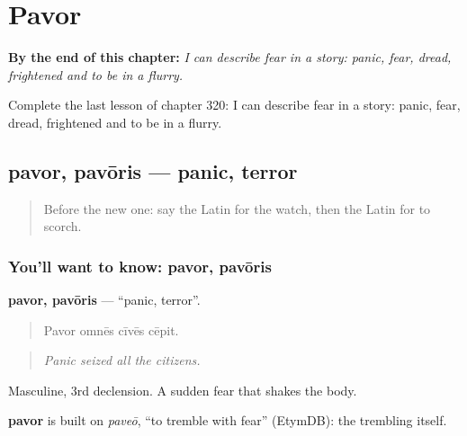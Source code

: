 
\chapter{Pavor}
\label{ch:la-pavor}

\begin{chapteropening}
\textbf{By the end of this chapter:} \emph{I can describe fear in a story: panic, fear, dread, frightened and to be in a flurry.}

Complete the last lesson of chapter 320: I can describe fear in a story: panic, fear, dread, frightened and to be in a flurry.
\end{chapteropening}

\section[pavor, pavōris]{pavor, pavōris — panic, terror}

\label{lesson:LA-C320-pavor}



\begin{quote}
Before the new one: say the Latin for the watch, then the Latin for to scorch.
\end{quote}

\subsection*{You'll want to know: pavor, pavōris}
\textbf{pavor, pavōris} — \textquotedblleft{}panic, terror\textquotedblright{}.

\begin{quote}
Pavor omnēs cīvēs cēpit.
\end{quote}

\begin{quote}
\emph{Panic seized all the citizens.}
\end{quote}

Masculine, 3rd declension. A sudden fear that shakes the body.

\begin{cousinweb}
\textbf{pavor} is built on \emph{paveō}, \textquotedblleft{}to tremble with fear\textquotedblright{} (EtymDB): the trembling itself.
\end{cousinweb}

